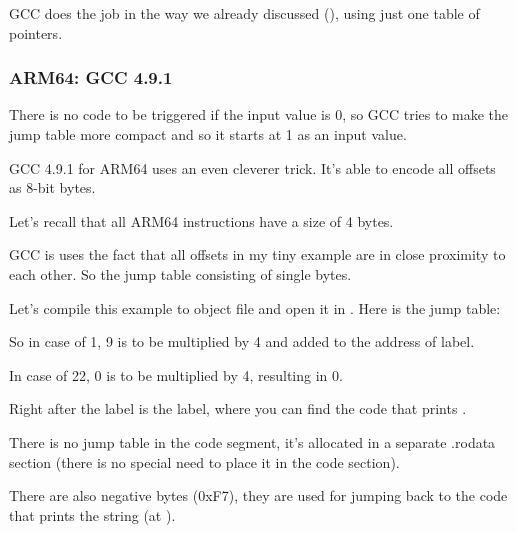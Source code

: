 GCC does the job in the way we already discussed (), using just one table of pointers.

\subsubsection{ARM64: \Optimizing GCC 4.9.1}

There is no code to be triggered if the input value is 0, so GCC tries to make the jump table more compact
and so it starts at 1 as an input value.

GCC 4.9.1 for ARM64 uses an even cleverer trick.
It's able to encode all offsets as 8-bit bytes.

Let's recall that all ARM64 instructions have a size of 4 bytes.

GCC is uses the fact that all offsets in my tiny example are in close proximity to each other.
So the jump table consisting of single bytes.



Let's compile this example to object file and open it in \IDA. Here is the jump table:



So in case of 1, 9 is to be multiplied by 4 and added to the address of  label.

In case of 22, 0 is to be multiplied by 4, resulting in 0. 

Right after the  label is the  label, where you can find the code that prints .

There is no jump table in the code segment, it's allocated in a separate .rodata section 
(there is no special need to place it in the code section).

There are also negative bytes (0xF7), they are used for jumping back to the code that prints the  string (at ).

